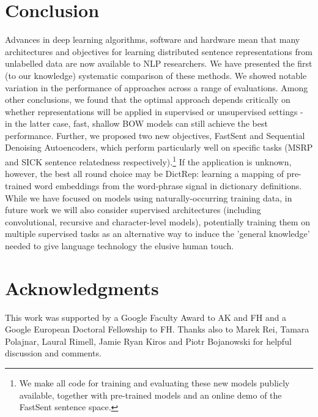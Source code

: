 \documentclass[11pt,letterpaper]{article}
\begin{document}
\section{Conclusion}
Advances in deep learning algorithms, software and hardware mean that many architectures and objectives for learning distributed sentence representations from unlabelled data are now available to NLP researchers. We have presented the first (to our knowledge) systematic comparison of these methods. We showed notable variation in the performance of approaches across a range of evaluations. Among other conclusions, we found that the optimal approach depends critically on whether representations will be applied in supervised or unsupervised settings - in the latter case, fast, shallow BOW models can still achieve the best performance. Further, we proposed two new objectives, FastSent and Sequential Denoising Autoencoders, which perform particularly well on specific tasks (MSRP and SICK sentence relatedness respectively).\footnote{We make all code for training and evaluating these new models publicly available, together with pre-trained models and an online demo of the FastSent sentence space.} If the application is unknown, however, the best all round choice may be DictRep: learning a mapping of pre-trained word embeddings from the word-phrase signal in dictionary definitions. While we have focused on models using naturally-occurring training data, in future work we will also consider supervised architectures (including convolutional, recursive and character-level models), potentially training them on multiple supervised tasks as an alternative way to induce the 'general knowledge' needed to give language technology the elusive human touch. 

\section*{Acknowledgments}

This work was supported by a Google Faculty Award to AK and FH and a Google European Doctoral Fellowship to FH. Thanks also to Marek Rei, Tamara Polajnar, Laural Rimell, Jamie Ryan Kiros and Piotr Bojanowski for helpful discussion and comments. 



\end{document}

